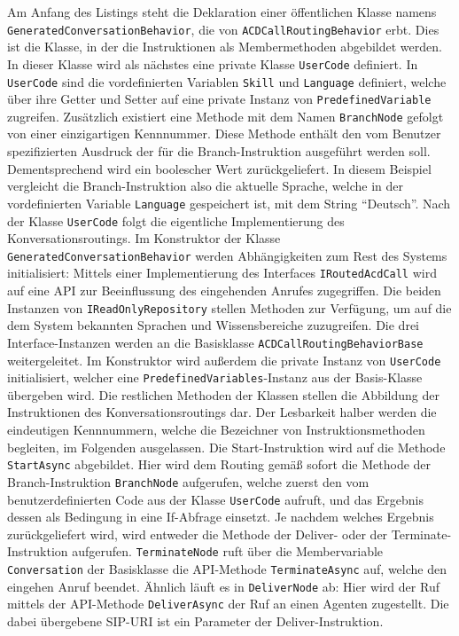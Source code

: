 \noindent Am Anfang des Listings steht die Deklaration einer öffentlichen Klasse namens \texttt{GeneratedConversationBehavior}, die von \texttt{ACDCallRoutingBehavior} erbt. Dies ist die Klasse, in der die Instruktionen als Membermethoden abgebildet werden. In dieser Klasse wird als nächstes eine private Klasse \texttt{UserCode} definiert. In \texttt{UserCode} sind die vordefinierten Variablen \texttt{Skill} und \texttt{Language} definiert, welche über ihre Getter und Setter auf eine private Instanz von \texttt{PredefinedVariable} zugreifen. Zusätzlich existiert eine Methode mit dem Namen \texttt{BranchNode} gefolgt von einer einzigartigen Kennnummer. Diese Methode enthält den vom Benutzer spezifizierten Ausdruck der für die Branch-Instruktion ausgeführt werden soll. Dementsprechend wird ein boolescher Wert zurückgeliefert. In diesem Beispiel vergleicht die Branch-Instruktion also die aktuelle Sprache, welche in der vordefinierten Variable \texttt{Language} gespeichert ist, mit dem String ``Deutsch''. 
\newline
Nach der Klasse \texttt{UserCode} folgt die eigentliche Implementierung des Konversationsroutings. Im Konstruktor der Klasse \texttt{GeneratedConversationBehavior} werden Abhängigkeiten zum Rest des Systems initialisiert: Mittels einer Implementierung des Interfaces \texttt{IRoutedAcdCall} wird auf eine API zur Beeinflussung des eingehenden Anrufes zugegriffen. Die beiden Instanzen von \texttt{IReadOnlyRepository} stellen Methoden zur Verfügung, um auf die dem System bekannten Sprachen und Wissensbereiche zuzugreifen. Die drei Interface-Instanzen werden an die Basisklasse \texttt{ACDCallRoutingBehaviorBase} weitergeleitet. Im Konstruktor wird außerdem die private Instanz von \texttt{UserCode} initialisiert, welcher eine \texttt{PredefinedVariables}-Instanz aus der Basis-Klasse übergeben wird. Die restlichen Methoden der Klassen stellen die Abbildung der Instruktionen des Konversationsroutings dar. Der Lesbarkeit halber werden die eindeutigen Kennnummern, welche die Bezeichner von Instruktionsmethoden begleiten, im Folgenden ausgelassen. Die Start-Instruktion wird auf die Methode \texttt{StartAsync} abgebildet. Hier wird dem Routing gemäß sofort die Methode der Branch-Instruktion \texttt{BranchNode} aufgerufen, welche zuerst den vom benutzerdefinierten Code aus der Klasse \texttt{UserCode} aufruft, und das Ergebnis dessen als Bedingung in eine If-Abfrage einsetzt. Je nachdem welches Ergebnis zurückgeliefert wird, wird entweder die Methode der Deliver- oder der Terminate-Instruktion aufgerufen. \texttt{TerminateNode} ruft über die Membervariable \texttt{Conversation} der Basisklasse die API-Methode \texttt{TerminateAsync} auf, welche den eingehen Anruf beendet. Ähnlich läuft es in \texttt{DeliverNode} ab: Hier wird der Ruf mittels der API-Methode \texttt{DeliverAsync} der Ruf an einen Agenten zugestellt. Die dabei übergebene SIP-URI ist ein Parameter der Deliver-Instruktion.

